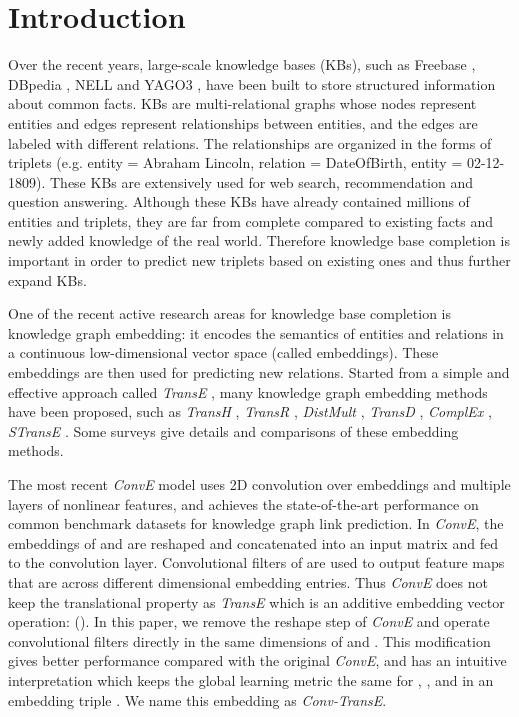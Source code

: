 \documentclass[letterpaper]{article} \usepackage{aaai19}  \usepackage{times}  \usepackage{helvet}  \usepackage{courier}  \usepackage{url}  \usepackage{graphicx}  \usepackage{amsmath}
\begin{document}
\section{Introduction}
\noindent

Over the recent years, large-scale knowledge bases (KBs), such as Freebase \cite{bollacker2008freebase}, DBpedia \cite{auer2007dbpedia}, NELL \cite{carlson2010toward} and YAGO3 \cite{mahdisoltani2013yago3}, have been built to store structured information about common facts. KBs are multi-relational graphs whose nodes represent entities and edges represent relationships between entities, and the edges are labeled with different relations. The relationships are organized in the forms of  triplets (e.g. entity  = Abraham Lincoln, relation  = DateOfBirth, entity  = 02-12-1809). These KBs are extensively used for web search, recommendation and question answering. Although these KBs have already contained millions of entities and triplets, they are far from complete compared to existing facts and newly added knowledge of the real world. Therefore knowledge base completion is important in order to predict new triplets based on existing ones and thus further expand KBs.

One of the recent active research areas for knowledge base completion is knowledge graph embedding: it encodes the semantics of entities and relations in a continuous low-dimensional vector space (called embeddings). These embeddings are then used for predicting new relations. Started from a simple and effective approach called
{\it TransE} \cite{bordes2013translating}, many knowledge graph embedding methods have been proposed, such as {\it TransH} \cite{wang2014knowledge}, {\it TransR} \cite{lin2015learning}, {\it DistMult} \cite{yang2014distmult}, {\it TransD} \cite{ji2015knowledge}, {\it ComplEx} \cite{trouillon2016complex}, {\it STransE} \cite{nguyen2016stranse}. Some surveys \cite{nguyen2017overview,wang2017knowledge} give details and comparisons of these embedding methods.

The most recent {\it ConvE} \cite{dettmers2017conve} model uses 2D convolution over embeddings and multiple layers of nonlinear features, and achieves the state-of-the-art performance on common benchmark datasets for knowledge graph link prediction. In {\it ConvE}, the embeddings of  and  are reshaped and concatenated into an input matrix and fed to the convolution layer. Convolutional filters of   are used to output feature maps that are across different dimensional embedding entries. Thus {\it ConvE} does not keep the translational property as {\it TransE} which is an additive embedding vector operation:  (\cite{nguyen2017novel}). In this paper, we remove the reshape step of {\it ConvE} and operate convolutional filters directly in the same dimensions of  and . This modification gives better performance compared with the original {\it ConvE}, and has an intuitive interpretation which keeps the global learning metric the same for , , and  in an embedding triple . We name this embedding as {\it Conv-TransE}.
\end{document}
